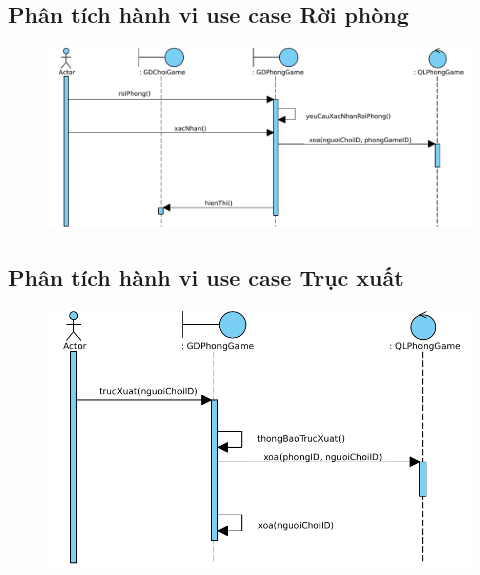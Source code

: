 \documentclass[3p]{elsarticle}
\begin{document}
\subsection{Phân tích hành vi use case Rời phòng}
\begin{figure}[!htbp]
	\hspace*{-.5in}
	\centering
	\includegraphics[scale=.55]{images/sequence-pdfs/gamer/PlayGame_Leave.pdf}
\end{figure}
\newpage

\subsection{Phân tích hành vi use case Trục xuất}
\begin{figure}[!htbp]
	\hspace*{-.5in}
	\centering
	\includegraphics[scale=.55]{images/sequence-pdfs/gamer/PlayGame_Kick.pdf}
\end{figure}
\end{document}
